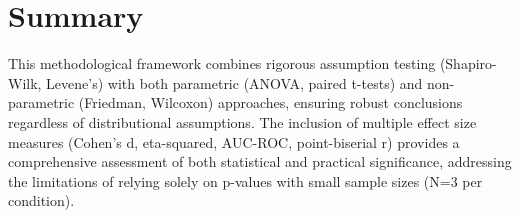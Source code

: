 \section{Summary}

This methodological framework combines rigorous assumption testing (Shapiro-Wilk, Levene's) with both parametric (ANOVA, paired t-tests) and non-parametric (Friedman, Wilcoxon) approaches, ensuring robust conclusions regardless of distributional assumptions. The inclusion of multiple effect size measures (Cohen's d, eta-squared, AUC-ROC, point-biserial r) provides a comprehensive assessment of both statistical and practical significance, addressing the limitations of relying solely on p-values with small sample sizes (N=3 per condition).
